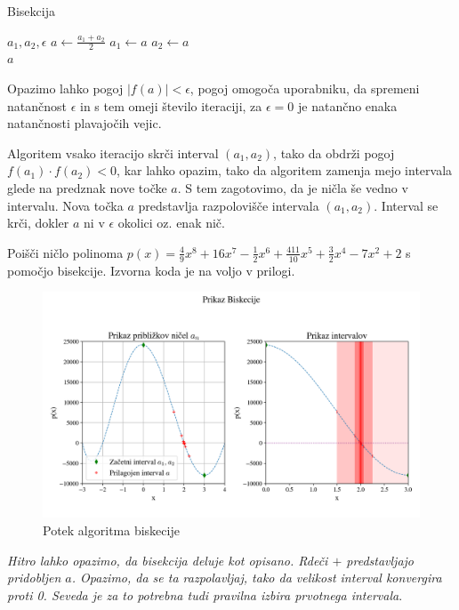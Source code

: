 \begin{algorithm}[H]
\caption{Bisekcija}
\begin{algorithmic}
\Require $a_1, a_2, \epsilon$
 
\State $a \gets \frac{a_1 + a_2}{2}$ 
 
    \State $ a_1 \gets a$
\Else{}
    \State $a_2 \gets a$
\EndIf
\EndWhile \\
\Return $a$
\end{algorithmic}
\end{algorithm}

Opazimo lahko pogoj $|f(a)| < \epsilon$, pogoj omogoča uporabniku, da spremeni natančnost $\epsilon$ in s tem omeji število iteraciji, za $\epsilon = 0$ je natančno enaka natančnosti plavajočih vejic.

Algoritem vsako iteracijo skrči interval $(a_1, a_2)$, tako da obdrži pogoj $f(a_1) \cdot f(a_2) < 0$, kar lahko opazim, tako da algoritem zamenja mejo intervala glede na predznak nove točke $a$. S tem zagotovimo, da je ničla še vedno v intervalu. Nova točka $a$ predstavlja razpolovišče intervala $(a_1, a_2)$. Interval se krči, dokler $a$ ni v $\epsilon$ okolici oz. enak nič.

\begin{primer}
    Poišči ničlo polinoma $p(x) = \frac{4}{9}x^8 + 16x^7 - \frac{1}{2}x^6 + \frac{411}{10}x^5 + \frac{3}{2}x^4 - 7x^2 + 2$ s pomočjo bisekcije. Izvorna koda je na voljo v prilogi.

\begin{figure}[H]
    \centering
    \includegraphics[width=1\textwidth]{img/bisection.png}
    \caption{Potek algoritma biskecije}
    \label{fig:bisection}
\end{figure}
\noindent
\textit{Hitro lahko opazimo, da bisekcija deluje kot opisano. Rdeči $+$ predstavljajo pridobljen $a$. Opazimo, da se ta razpolavljaj, tako da velikost interval konvergira proti 0. Seveda je za to potrebna tudi pravilna izbira prvotnega intervala}.
    
\end{primer}






